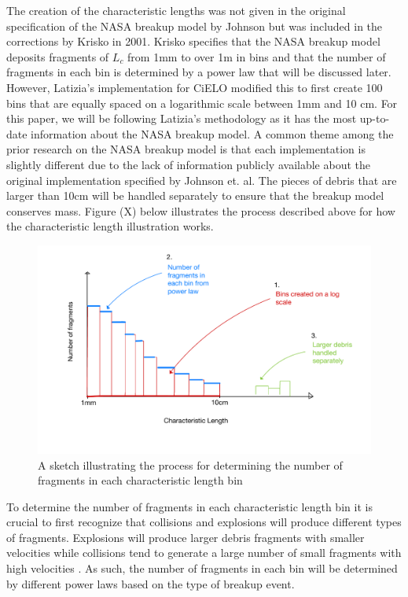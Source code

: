 \documentclass[a4paper, 12pt]{article}
\begin{document}
The creation of the characteristic lengths was not given in the original specification of the NASA breakup model by Johnson but was included in the corrections by Krisko in 2001. Krisko specifies that the NASA breakup model deposits fragments of $L_c$ from 1mm to over 1m in bins and that the number of fragments in each bin is determined by a power law that will be discussed later. However, Latizia's implementation for CiELO modified this to first create 100 bins that are equally spaced on a logarithmic scale between 1mm and 10 cm. For this paper, we will be following Latizia's methodology as it has the most up-to-date information about the NASA breakup model. A common theme among the prior research on the NASA breakup model is that each implementation is slightly different due to the lack of information publicly available about the original implementation specified by Johnson et. al. The pieces of debris that are larger than 10cm will be handled separately to ensure that the breakup model conserves mass. Figure (X) below illustrates the process described above for how the characteristic length illustration works.

\begin{figure}[H]
	\centering
	\includegraphics[scale=0.6]{L_c_sketch}
	\caption{A sketch illustrating the process for determining the number of fragments in each characteristic length bin}
\end{figure}

To determine the number of fragments in each characteristic length bin it is crucial to first recognize that collisions and explosions will produce different types of fragments. Explosions will produce larger debris fragments with smaller velocities while collisions tend to generate a large number of small fragments with high velocities \citep{barrows_evolution_1996}.  As such, the number of fragments in each bin will be determined by different power laws based on the type of breakup event.
 
\end{document}
